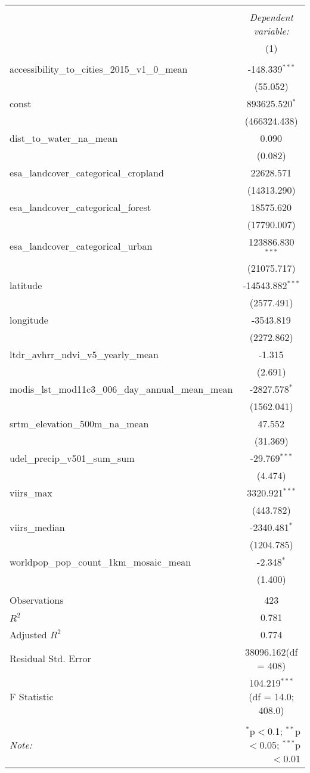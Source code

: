 \begin{table}[!htbp] \centering
\begin{tabular}{@{\extracolsep{5pt}}lc}
\\[-1.8ex]\hline
\hline \\[-1.8ex]
& \multicolumn{1}{c}{\textit{Dependent variable:}} \
\cr \cline{1-2}
\\[-1.8ex] & (1) \\
\hline \\[-1.8ex]
 accessibility_to_cities_2015_v1_0_mean & -148.339$^{***}$ \\
  & (55.052) \\
 const & 893625.520$^{*}$ \\
  & (466324.438) \\
 dist_to_water_na_mean & 0.090$^{}$ \\
  & (0.082) \\
 esa_landcover_categorical_cropland & 22628.571$^{}$ \\
  & (14313.290) \\
 esa_landcover_categorical_forest & 18575.620$^{}$ \\
  & (17790.007) \\
 esa_landcover_categorical_urban & 123886.830$^{***}$ \\
  & (21075.717) \\
 latitude & -14543.882$^{***}$ \\
  & (2577.491) \\
 longitude & -3543.819$^{}$ \\
  & (2272.862) \\
 ltdr_avhrr_ndvi_v5_yearly_mean & -1.315$^{}$ \\
  & (2.691) \\
 modis_lst_mod11c3_006_day_annual_mean_mean & -2827.578$^{*}$ \\
  & (1562.041) \\
 srtm_elevation_500m_na_mean & 47.552$^{}$ \\
  & (31.369) \\
 udel_precip_v501_sum_sum & -29.769$^{***}$ \\
  & (4.474) \\
 viirs_max & 3320.921$^{***}$ \\
  & (443.782) \\
 viirs_median & -2340.481$^{*}$ \\
  & (1204.785) \\
 worldpop_pop_count_1km_mosaic_mean & -2.348$^{*}$ \\
  & (1.400) \\
\hline \\[-1.8ex]
 Observations & 423 \\
 $R^2$ & 0.781 \\
 Adjusted $R^2$ & 0.774 \\
 Residual Std. Error & 38096.162(df = 408)  \\
 F Statistic & 104.219$^{***}$ (df = 14.0; 408.0) \\
\hline
\hline \\[-1.8ex]
\textit{Note:} & \multicolumn{1}{r}{$^{*}$p$<$0.1; $^{**}$p$<$0.05; $^{***}$p$<$0.01} \\
\end{tabular}
\end{table}